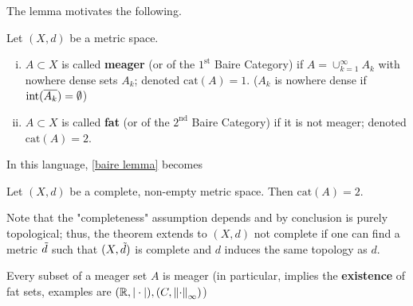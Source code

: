 \documentclass{article}
\begin{document}
\begin{flushleft}
The lemma motivates the following.  
\end{flushleft}


\begin{definition}  
    Let $(X,d)$ be a metric space.  
    \begin{enumerate}[i)]
    \item $A \subset X$ is called \textbf{meager} (or of the $1^{\textrm{st}}$ Baire Category) if $A = \cup_{k=1}^{\infty} A_k$ with nowhere dense sets $A_k$; denoted $\textrm{cat}(A)=1$. ($A_k$ is nowhere dense if $\textrm{int}(\overline{A_k})=\emptyset$)
    \item $A \subset X$ is called \textbf{fat} (or of the $2^{\textrm{nd}}$ Baire Category) if it is not meager; denoted $\textrm{cat}(A)=2$.  
\end{enumerate} 
\end{definition} 

In this language, \cref{baire lemma} becomes  

\begin{theorem}
\nl
\label{baire category}
Let  $(X,d)$ be a complete, non-empty metric space. Then $\textrm{cat}(A)=2$.  
\end{theorem}  
Note that the "completeness" assumption depends and by conclusion is purely topological; thus, the theorem extends to $(X,d)$ not complete if one can find a metric $\Tilde{d}$ such that $(X, \Tilde{d})$ is complete and $d$ induces the same topology as $d$.

\begin{remark}
    Every subset of a meager set $A$ is meager (in particular,  implies the \textbf{existence} of fat sets, examples are $(\mathbb{R}, |\cdot|), (C, \left\|{\cdot}\right\|_{\infty})$)
\end{remark}
\end{document}
